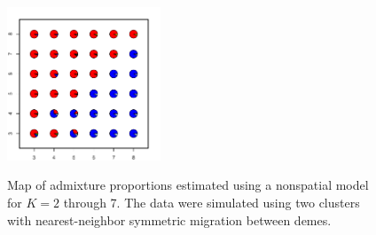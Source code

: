 \documentclass[12pt]{article}
\begin{document}
\begin{figure}
			{\includegraphics[width=1.8in,height=1.8in]{figs/sims/simK2_nsp_pies_K7.pdf}}
	\caption{
	Map of admixture proportions estimated using a nonspatial model for $K=2$ through 7.
	The data were simulated using two clusters with nearest-neighbor symmetric migration between demes.
    }\label{simK2_nsp_pies}
\end{figure}
\end{document}

